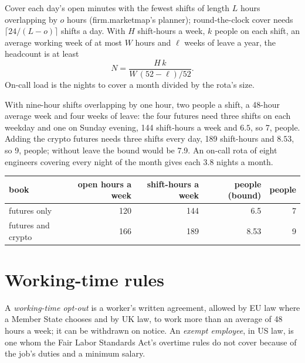 \begin{method}\label{met:in:hours-rhythm-and-intensity:headcount}
Cover each day's open minutes with the fewest shifts of length $L$ hours overlapping by $o$ hours (firm.marketmap's
planner); round-the-clock cover needs $\lceil 24/(L-o)\rceil$ shifts a day. With $H$ shift-hours a week, $k$ people on
each shift, an average working week of at most $W$ hours and $\ell$ weeks of leave a year, the headcount is at least
\[
N=\frac{H\,k}{W\,(52-\ell)/52}.
\]
On-call load is the nights to cover a month divided by the rota's size.
\end{method}

\begin{example}\label{ex:in:hours-rhythm-and-intensity:desk}
With nine-hour shifts overlapping by one hour, two people a shift, a 48-hour average week and four weeks of leave: the
four futures need three shifts on each weekday and one on Sunday evening, 144 shift-hours a week and $6.5$, so 7,
people. Adding the crypto futures needs three shifts every day, 189 shift-hours and $8.53$, so 9, people; without leave
the bound would be 7.9. An on-call rota of eight engineers covering every night of the month gives each 3.8 nights a
month.
\end{example}

\begin{center}\footnotesize
\begin{tabular}{@{}lrrrr@{}}
\toprule
book & open hours a week & shift-hours a week & people (bound) & people\\
\midrule
futures only & 120 & 144 & 6.5 & 7\\
futures and crypto & 166 & 189 & 8.53 & 9\\
\bottomrule
\end{tabular}
\end{center}

\section{Working-time rules}

\begin{definition}\label{def:in:hours-rhythm-and-intensity:rules}
A \emph{working-time opt-out} is a worker's written agreement, allowed by EU law where a
Member State chooses and by UK law, to work more than an average of 48 hours a week; it can be withdrawn on notice. An
\emph{exempt employee}, in US law, is one whom the Fair Labor Standards Act's overtime rules do not
cover because of the job's duties and a minimum salary.
\end{definition}

